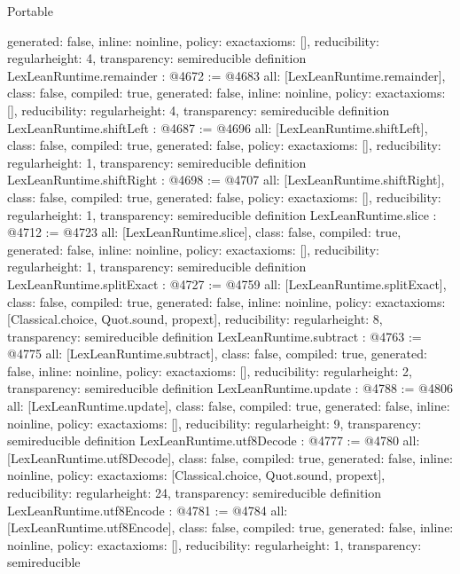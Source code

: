 \begin{lexlean}{Portable}
\begin{coremodule}
{  generated: false,
  inline: noinline,
  policy: exact{axioms: []},
  reducibility: regular{height: 4},
  transparency: semireducible
}
definition LexLeanRuntime.remainder : @4672 := @4683 {
  all: [LexLeanRuntime.remainder],
  class: false,
  compiled: true,
  generated: false,
  inline: noinline,
  policy: exact{axioms: []},
  reducibility: regular{height: 4},
  transparency: semireducible
}
definition LexLeanRuntime.shiftLeft : @4687 := @4696 {
  all: [LexLeanRuntime.shiftLeft],
  class: false,
  compiled: true,
  generated: false,
  policy: exact{axioms: []},
  reducibility: regular{height: 1},
  transparency: semireducible
}
definition LexLeanRuntime.shiftRight : @4698 := @4707 {
  all: [LexLeanRuntime.shiftRight],
  class: false,
  compiled: true,
  generated: false,
  policy: exact{axioms: []},
  reducibility: regular{height: 1},
  transparency: semireducible
}
definition LexLeanRuntime.slice : @4712 := @4723 {
  all: [LexLeanRuntime.slice],
  class: false,
  compiled: true,
  generated: false,
  inline: noinline,
  policy: exact{axioms: []},
  reducibility: regular{height: 1},
  transparency: semireducible
}
definition LexLeanRuntime.splitExact : @4727 := @4759 {
  all: [LexLeanRuntime.splitExact],
  class: false,
  compiled: true,
  generated: false,
  inline: noinline,
  policy: exact{axioms: [Classical.choice, Quot.sound, propext]},
  reducibility: regular{height: 8},
  transparency: semireducible
}
definition LexLeanRuntime.subtract : @4763 := @4775 {
  all: [LexLeanRuntime.subtract],
  class: false,
  compiled: true,
  generated: false,
  inline: noinline,
  policy: exact{axioms: []},
  reducibility: regular{height: 2},
  transparency: semireducible
}
definition LexLeanRuntime.update : @4788 := @4806 {
  all: [LexLeanRuntime.update],
  class: false,
  compiled: true,
  generated: false,
  inline: noinline,
  policy: exact{axioms: []},
  reducibility: regular{height: 9},
  transparency: semireducible
}
definition LexLeanRuntime.utf8Decode : @4777 := @4780 {
  all: [LexLeanRuntime.utf8Decode],
  class: false,
  compiled: true,
  generated: false,
  inline: noinline,
  policy: exact{axioms: [Classical.choice, Quot.sound, propext]},
  reducibility: regular{height: 24},
  transparency: semireducible
}
definition LexLeanRuntime.utf8Encode : @4781 := @4784 {
  all: [LexLeanRuntime.utf8Encode],
  class: false,
  compiled: true,
  generated: false,
  inline: noinline,
  policy: exact{axioms: []},
  reducibility: regular{height: 1},
  transparency: semireducible
}


\end{coremodule}
\end{lexlean}
